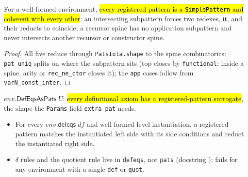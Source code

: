 \begin{lemma}
\label{family:indparams-params-sides}
\leanok
{} 

 For a well-formed environment, \hl{every registered pattern is a
\texttt{SimplePattern} and coherent with every other}: an intersecting subpattern forces two
redexes, it, and their reducts to coincide; a recursor spine has no application subpattern
and never intersects another recursor or constructor spine.
\end{lemma}
\begin{proof}
\leanok
{} All five reduce through \texttt{PatsIota.shape} to the spine combinatorics:
\texttt{pat\_uniq} splits on where the subpattern sits (top closes by \texttt{functional};
inside a spine, arity or \texttt{rec\_ne\_ctor} closes it); the \texttt{app} cases follow
from \texttt{varN\_const\_inter}.
\end{proof}

\begin{definition}
\label{def:indparams-defeqs-as-pats}
\leanok
{} 

 $env.\mathsf{DefEqsAsPats}\;U$: \hl{every definitional axiom has a
registered-pattern surrogate}, the shape the \texttt{Params} field \texttt{extra\_pat}
needs.
\begin{itemize}
\item For every $env.\mathsf{defeqs}\;df$ and well-formed level instantiation, a registered
pattern matches the instantiated left side with its side conditions and reduct the
instantiated right side.
\item {} $\delta$ rules and the quotient rule live in \texttt{defeqs}, not
\texttt{pats} (docstring ); fails
for any environment with a single \texttt{def} or \texttt{quot}.
\end{itemize}
\end{definition}

